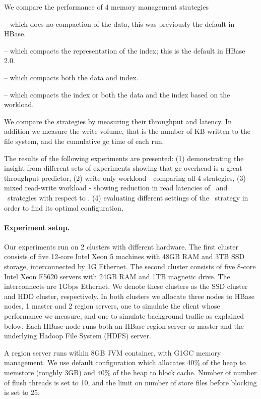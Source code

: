 We compare the performance of 4 memory management strategies 
\begin{description}
\setlength{\itemsep}{0pt}
  \setlength{\parskip}{0pt}
\item[\none] -- which does no compaction of the data, this was previously the default in HBase.
\item[\basic] -- which compacts the representation of the index; this is the default in HBase 2.0.
\item[\eager] -- which compacts both the data and index.
\item[\magic] -- which compacts the index or both the data and the index based on the workload.
\end{description}

We compare the strategies by measuring their throughput and latency. In addition we measure the write volume, that is the number of KB written to the file system, and the cumulative gc time of each run.

The results of the following experiments are presented:
(1) demonstrating the insight from different sets of experiments showing that gc overhead is a great throughput predictor,
(2) write-only workload - comparing all 4 strategies,
(3) mixed read-write workload - showing reduction in read latencies of \basic\ and \magic\ strategies with respect to \none.
(4) evaluating different settings of the \basic\ strategy in order to find its optimal configuration,

\paragraph{Experiment setup.}

Our experiments run on 2 clusters with different hardware. 
The first cluster consists of five 12-core Intel Xeon 5 machines with 48GB RAM and 3TB 
SSD storage, interconnected by 1G Ethernet. 
The second cluster consists of five 8-core 
Intel Xeon E5620 servers with 24GB RAM and 1TB magnetic drive. The interconnects  are 1Gbps Ethernet. 
We denote these clusters as the SSD cluster and HDD cluster, respectively.
In both clusters we allocate three nodes to HBase nodes, 1 master and 2 region servers, one to simulate the client whose performance we measure, and one to simulate background traffic
as explained below. Each HBase node runs both an HBase region server or master and the underlying 
Hadoop File System (HDFS) server.
 
A region server runs within 8GB JVM container, with G1GC memory management. We use default configuration which allocates 40\% of the heap to memstore (roughly 3GB) and 40\% of the heap to block cache. 
Number of number of flush threads is set to 10, and  the limit on number of store files before blocking is set to 25.

